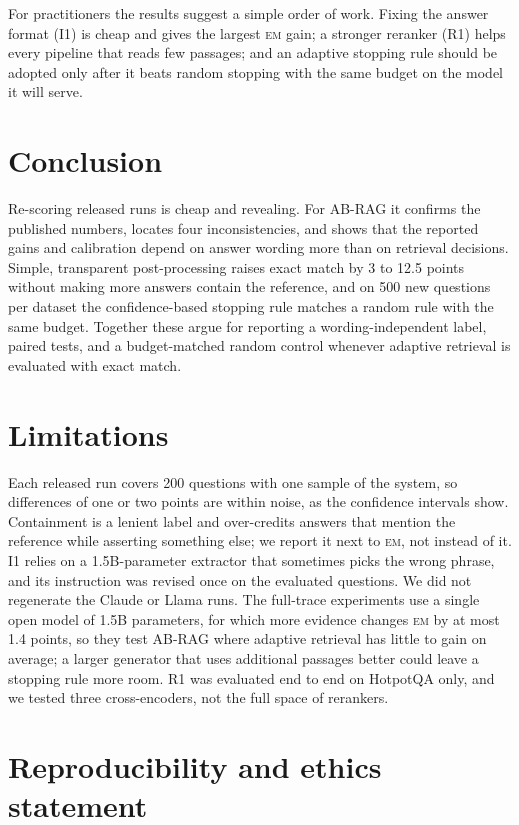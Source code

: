 \documentclass[11pt]{article}
\newcommand{\EM}{\textsc{em}}
\begin{document}
For practitioners the results suggest a simple order of work. Fixing the answer format (I1) is cheap and gives the largest \EM{} gain; a stronger reranker (R1) helps every pipeline that reads few passages; and an adaptive stopping rule should be adopted only after it beats random stopping with the same budget on the model it will serve.

\section{Conclusion}

Re-scoring released runs is cheap and revealing. For AB-RAG it confirms the published numbers, locates four inconsistencies, and shows that the reported gains and calibration depend on answer wording more than on retrieval decisions. Simple, transparent post-processing raises exact match by 3 to 12.5 points without making more answers contain the reference, and on 500 new questions per dataset the confidence-based stopping rule matches a random rule with the same budget. Together these argue for reporting a wording-independent label, paired tests, and a budget-matched random control whenever adaptive retrieval is evaluated with exact match.

\section*{Limitations}

Each released run covers 200 questions with one sample of the system, so differences of one or two points are within noise, as the confidence intervals show. Containment is a lenient label and over-credits answers that mention the reference while asserting something else; we report it next to \EM{}, not instead of it. I1 relies on a 1.5B-parameter extractor that sometimes picks the wrong phrase, and its instruction was revised once on the evaluated questions. We did not regenerate the Claude or Llama runs. The full-trace experiments use a single open model of 1.5B parameters, for which more evidence changes \EM{} by at most 1.4 points, so they test AB-RAG where adaptive retrieval has little to gain on average; a larger generator that uses additional passages better could leave a stopping rule more room. R1 was evaluated end to end on HotpotQA only, and we tested three cross-encoders, not the full space of rerankers.

\section*{Reproducibility and ethics statement}
\end{document}
